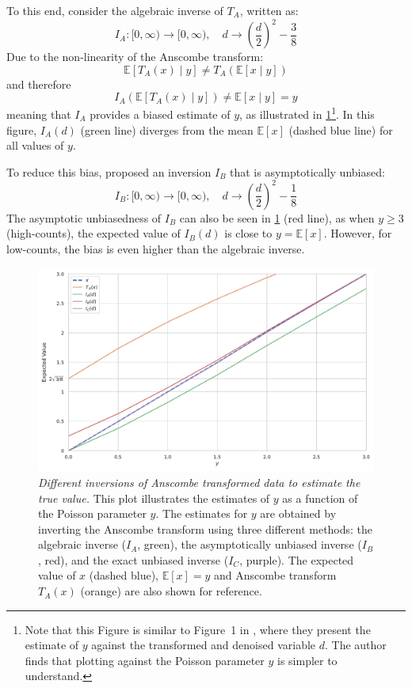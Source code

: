 To this end, consider the algebraic inverse of $T_A$, written as:
\begin{equation}
    I_A: [0, \infty) \to [0, \infty), \quad d \to \left(\frac{d}{2} \right)^2 - \frac{3}{8}
\end{equation}
Due to the non-linearity of the Anscombe transform:
\begin{equation*}
    \mathbb{E}[T_A(x) \mid y] \neq T_A(\mathbb{E}[x \mid y])
\end{equation*}
and therefore
\begin{equation*}
    I_A(\mathbb{E}[T_A(x) \mid y]) \neq \mathbb{E}[x \mid y] = y
\end{equation*}
meaning that $I_A$ provides a biased estimate of $y$, as illustrated in \cref{fig:anscombe-expectation-inversion}\footnote{Note that this Figure is similar to Figure~1 in \cite{makitaloOptimalInversionAnscombe2011}, where they present the estimate of $y$ against the transformed and denoised variable $d$. The author finds that plotting against the Poisson parameter $y$ is simpler to understand.}. In this figure, $I_A(d)$ (green line) diverges from the mean $\mathbb{E}[x]$ (dashed blue line) for all values of $y$. 

To reduce this bias, \citeauthor{anscombeTransformationPoissonBinomial1948} \cite{anscombeTransformationPoissonBinomial1948} proposed an inversion $I_B$ that is asymptotically unbiased:
\begin{equation}
    I_B: [0, \infty) \to [0, \infty), \quad d \to \left(\frac{d}{2} \right)^2 - \frac{1}{8}
\end{equation}
The asymptotic unbiasedness of $I_B$ can also be seen in \cref{fig:anscombe-expectation-inversion} (red line), as when $y \geq 3$ (high-counts), the expected value of $I_B(d)$ is close to $y=\mathbb{E}[x]$. However, for low-counts, the bias is even higher than the algebraic inverse.

\begin{figure}
    \centering
    \includegraphics[width=0.7\linewidth]{images/anscombe_expectation_inversion.pdf}
    \caption{\textit{Different inversions of Anscombe transformed data to estimate the true value.} This plot illustrates the estimates of $y$ as a function of the Poisson parameter $y$. The estimates for $y$ are obtained by inverting the Anscombe transform using three different methods: the algebraic inverse ($I_A$, green), the asymptotically unbiased inverse ($I_B$, red), and the exact unbiased inverse ($I_C$, purple). The expected value of $x$ (dashed blue), $\mathbb{E}[x]=y$ and Anscombe transform $T_A(x)$ (orange) are also shown for reference.}
    \label{fig:anscombe-expectation-inversion}
\end{figure}

